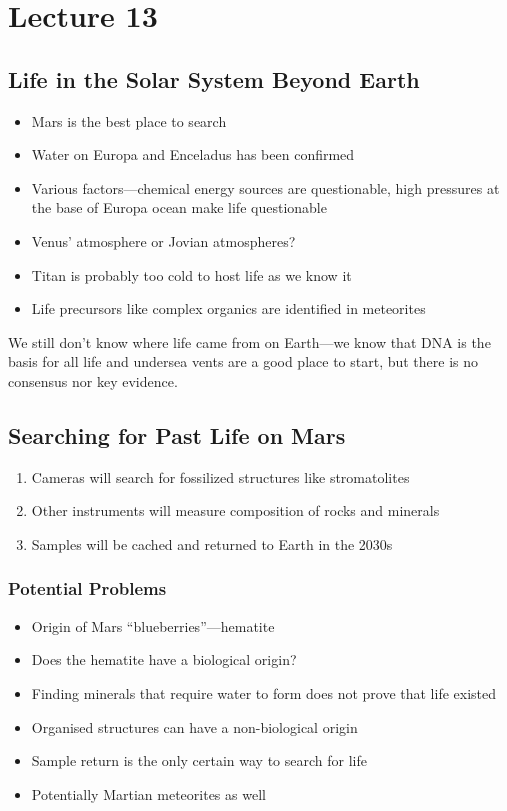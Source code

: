 \documentclass[class=article, crop=false]{standalone}
\begin{document}
  \section{Lecture 13}
  \subsection{Life in the Solar System Beyond Earth}
  \begin{itemize}
    \item Mars is the best place to search
    \item Water on Europa and Enceladus has been confirmed
    \item Various factors---chemical energy sources are questionable, high pressures at the base of Europa ocean make life questionable
    \item Venus' atmosphere or Jovian atmospheres?
    \item Titan is probably too cold to host life as we know it
    \item Life precursors like complex organics are identified in meteorites
  \end{itemize}
  We still don't know where life came from on Earth---we know that DNA is the basis for all life and undersea vents are a good place to start, but there is no consensus nor key evidence.
  \subsection{Searching for Past Life on Mars}
  \begin{enumerate}
    \item Cameras will search for fossilized structures like stromatolites
    \item Other instruments will measure composition of rocks and minerals
    \item Samples will be cached and returned to Earth in the 2030s
  \end{enumerate}
  \subsubsection{Potential Problems}
  \begin{itemize}
    \item Origin of Mars ``blueberries''---hematite
    \item Does the hematite have a biological origin?
    \item Finding minerals that require water to form does not prove that life existed
    \item Organised structures can have a non-biological origin
    \item Sample return is the only certain way to search for life
    \item Potentially Martian meteorites as well
  \end{itemize}
\end{document}
